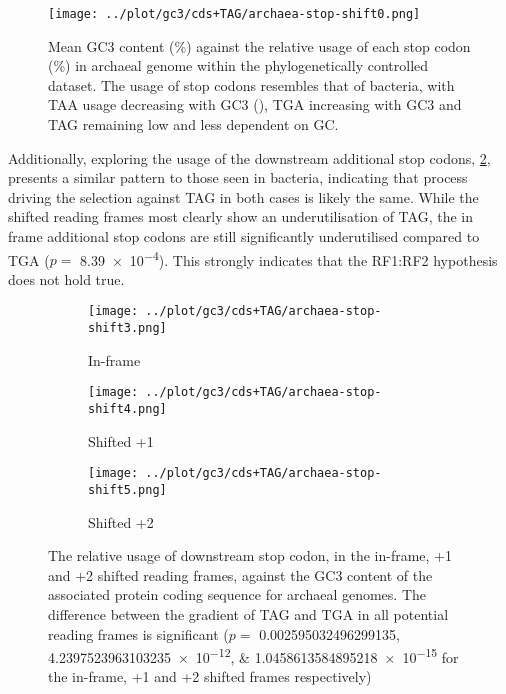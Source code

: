 \documentclass[../main.tex]{subfile}
\begin{document}
        \begin{figure}[H]
            \centering
            \texttt{[image: ../plot/gc3/cds+TAG/archaea-stop-shift0.png]}
            \caption{%
                Mean GC3 content (\%) against the relative usage of each stop codon (\%) in archaeal genome within the phylogenetically controlled dataset. The usage of stop codons resembles that of bacteria, with TAA usage decreasing with GC3 (), TGA increasing with GC3 and TAG remaining low and less dependent on GC.
            }
            \label{fig:results/stopUsage/archaea/protein}
        \end{figure}

        Additionally, exploring the usage of the downstream additional stop codons, \cref{fig:results/archaea/protein/shifted}, presents a similar pattern to those seen in bacteria, indicating that process driving the selection against TAG in both cases is likely the same. While the shifted reading frames most clearly show an underutilisation of TAG, the in frame additional stop codons are still significantly underutilised compared to TGA ($p=$ \num{8.39e-4}). This strongly indicates that the RF1:RF2 hypothesis does not hold true.

        \begin{figure}[H]
            \centering
            \begin{subfigure}{.45\textwidth}
                \texttt{[image: ../plot/gc3/cds+TAG/archaea-stop-shift3.png]}
                \caption{In-frame}
            \end{subfigure}
            \begin{subfigure}{.45\textwidth}
                \texttt{[image: ../plot/gc3/cds+TAG/archaea-stop-shift4.png]}
                \caption{Shifted +1}
            \end{subfigure}
            \begin{subfigure}{.45\textwidth}
                \texttt{[image: ../plot/gc3/cds+TAG/archaea-stop-shift5.png]}
                \caption{Shifted +2}
            \end{subfigure}

            \caption{%
                The relative usage of downstream stop codon, in the in-frame, +1 and +2 shifted reading frames, against the GC3 content of the associated protein coding sequence for archaeal genomes.
                The difference between the gradient of TAG and TGA in all potential reading frames is significant ($p=$ \numlist[scientific-notation = true, round-mode=figures, round-precision=2]{0.002595032496299135;4.2397523963103235e-12;1.0458613584895218e-15} for the in-frame, +1 and +2 shifted frames respectively)
            }
            \label{fig:results/archaea/protein/shifted}
        \end{figure}
\end{document}
